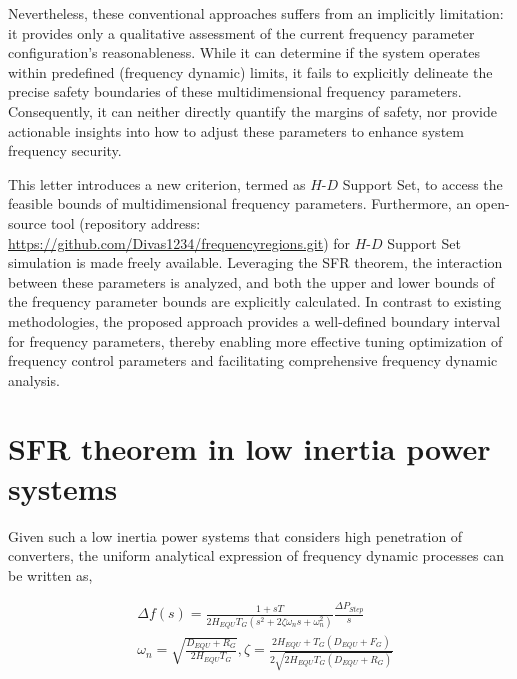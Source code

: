 \documentclass[lettersize,journal]{IEEEtran}
\begin{document}
Nevertheless, these conventional approaches suffers from an implicitly limitation: it provides only a qualitative assessment of the current frequency parameter configuration's reasonableness. While it can determine if the system operates within predefined (frequency dynamic) limits, it fails to explicitly delineate the precise safety boundaries of these multidimensional frequency parameters. Consequently, it can neither directly quantify the margins of safety, nor provide actionable insights into how to adjust these parameters to enhance system frequency security.


This letter introduces a new criterion, termed as $H$-$D$ Support Set, to access the feasible bounds of multidimensional frequency parameters. Furthermore, an open-source tool (repository address: \url{https://github.com/Divas1234/frequencyregions.git}) for $H$-$D$ Support Set simulation is made freely available. Leveraging the SFR theorem, the interaction between these parameters is analyzed, and both the upper and lower bounds of the frequency parameter bounds are explicitly calculated. In contrast to existing methodologies, the proposed approach provides a well-defined boundary interval for frequency parameters, thereby enabling more effective tuning optimization of frequency control parameters and facilitating comprehensive frequency dynamic analysis.

\vspace{-0.25cm}
\section{SFR theorem in low inertia power systems}

Given such a low inertia power systems that considers high penetration of converters, the uniform analytical expression of frequency dynamic processes can be written as,

\vspace{-0.25cm}
\begin{subequations}
\begin{align}
  \!\!\!\!&\varDelta f(s) \!=\! \frac{1+sT}{2H_{EQU}T_{G}(s^2 + 2\zeta \omega_n s + \omega_n^2)}\frac{\varDelta P_{Step}}{s}\label{eq:Lsfr}\\
  \!\!\!\!&\omega_n \!=\! \sqrt{\!\frac{D_{EQU} \!+\! R_G}{2H_{EQU}T_G}}, \zeta \!=\! \frac{2H_{EQU}  \!+\! T_G(D_{EQU} \!+\! F_G)}{2\sqrt{2H_{EQU}T_G(D_{EQU} \!+\! R_G)}}
\end{align}
\end{subequations}
\end{document}
